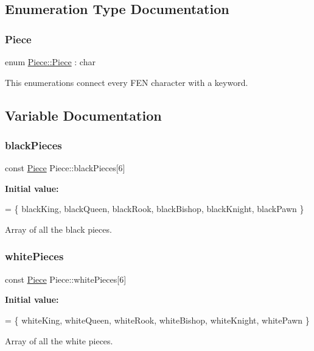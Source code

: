 \subsection{Enumeration Type Documentation}
\mbox{\label{namespacePiece_a588233307aa6bdb32c1d62c9f20895cc}} 
\subsubsection{\texorpdfstring{Piece}{Piece}}
{\footnotesize\ttfamily enum \hyperlink{namespacePiece_a588233307aa6bdb32c1d62c9f20895cc}{Piece\+::\+Piece} \+: char}

This enumerations connect every F\+EN character with a keyword. 

\subsection{Variable Documentation}
\mbox{\label{namespacePiece_a531c90c92acec2708048ce3b9caddf2a}} 
\subsubsection{\texorpdfstring{black\+Pieces}{blackPieces}}
{\footnotesize\ttfamily const \hyperlink{namespacePiece_a588233307aa6bdb32c1d62c9f20895cc}{Piece} Piece\+::black\+Pieces\mbox{[}6\mbox{]}\hspace{0.3cm}{\ttfamily [static]}}

{\bfseries Initial value\+:}
\begin{DoxyCode}
=
\{ blackKing, blackQueen, blackRook, blackBishop, blackKnight, blackPawn \}
\end{DoxyCode}
Array of all the black pieces. \mbox{\label{namespacePiece_a8c9ba77d6f9a9bb67a5a5d8e95a9f945}} 
\subsubsection{\texorpdfstring{white\+Pieces}{whitePieces}}
{\footnotesize\ttfamily const \hyperlink{namespacePiece_a588233307aa6bdb32c1d62c9f20895cc}{Piece} Piece\+::white\+Pieces\mbox{[}6\mbox{]}\hspace{0.3cm}{\ttfamily [static]}}

{\bfseries Initial value\+:}
\begin{DoxyCode}
=
\{ whiteKing, whiteQueen, whiteRook, whiteBishop, whiteKnight, whitePawn \}
\end{DoxyCode}
Array of all the white pieces. 